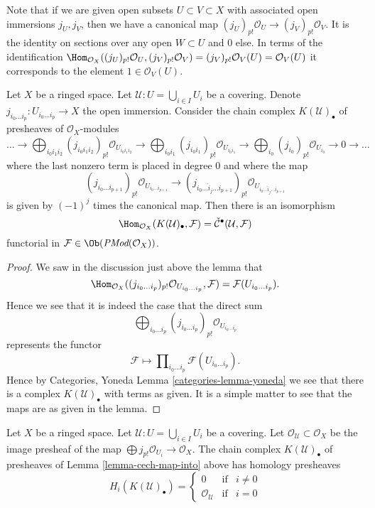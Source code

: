 \medskip\noindent
Note that if we are given open subsets $U \subset V \subset X$
with associated open immersions $j_U, j_V$, then we have a canonical
map $(j_U)_{p!}\mathcal{O}_U \to (j_V)_{p!}\mathcal{O}_V$. It is the
identity on sections over any open $W \subset U$ and $0$ else.
In terms of the identification
$\Hom_{\mathcal{O}_X}((j_U)_{p!}\mathcal{O}_U, (j_V)_{p!}\mathcal{O}_V) =
(j_V)_{p!}\mathcal{O}_V(U) = \mathcal{O}_V(U)$ it corresponds to
the element $1 \in \mathcal{O}_V(U)$.

\begin{lemma}
\label{lemma-cech-map-into}
Let $X$ be a ringed space.
Let $\mathcal{U} : U = \bigcup_{i \in I} U_i$ be a covering.
Denote $j_{i_0\ldots i_p} : U_{i_0 \ldots i_p} \to X$ the open immersion.
Consider the chain complex $K(\mathcal{U})_\bullet$
of presheaves of $\mathcal{O}_X$-modules
$$
\ldots
\to
\bigoplus_{i_0i_1i_2} (j_{i_0i_1i_2})_{p!}\mathcal{O}_{U_{i_0i_1i_2}}
\to
\bigoplus_{i_0i_1} (j_{i_0i_1})_{p!}\mathcal{O}_{U_{i_0i_1}}
\to
\bigoplus_{i_0} (j_{i_0})_{p!}\mathcal{O}_{U_{i_0}}
\to 0 \to \ldots
$$
where the last nonzero term is placed in degree $0$
and where the map
$$
(j_{i_0\ldots i_{p + 1}})_{p!}\mathcal{O}_{U_{i_0\ldots i_{p + 1}}}
\longrightarrow
(j_{i_0\ldots \hat i_j \ldots i_{p + 1}})_{p!}
\mathcal{O}_{U_{i_0\ldots \hat i_j \ldots i_{p + 1}}}
$$
is given by $(-1)^j$ times the canonical map.
Then there is an isomorphism
$$
\Hom_{\mathcal{O}_X}(K(\mathcal{U})_\bullet, \mathcal{F})
=
\check{\mathcal{C}}^\bullet(\mathcal{U}, \mathcal{F})
$$
functorial in $\mathcal{F} \in \Ob(\textit{PMod}(\mathcal{O}_X))$.
\end{lemma}

\begin{proof}
We saw in the discussion just above the lemma that
$$
\Hom_{\mathcal{O}_X}(
(j_{i_0\ldots i_p})_{p!}\mathcal{O}_{U_{i_0\ldots i_p}},
\mathcal{F})
=
\mathcal{F}(U_{i_0\ldots i_p}).
$$
Hence we see that it is indeed the case that the direct sum
$$
\bigoplus\nolimits_{i_0 \ldots i_p}
(j_{i_0 \ldots i_p})_{p!}\mathcal{O}_{U_{i_0 \ldots i_p}}
$$
represents the functor
$$
\mathcal{F}
\longmapsto
\prod\nolimits_{i_0\ldots i_p} \mathcal{F}(U_{i_0\ldots i_p}).
$$
Hence by Categories, Yoneda Lemma \ref{categories-lemma-yoneda}
we see that there is a complex $K(\mathcal{U})_\bullet$ with terms
as given. It is a simple matter to see that the maps are as given
in the lemma.
\end{proof}

\begin{lemma}
\label{lemma-homology-complex}
Let $X$ be a ringed space.
Let $\mathcal{U} : U = \bigcup_{i \in I} U_i$ be a covering.
Let $\mathcal{O}_\mathcal{U} \subset \mathcal{O}_X$
be the image presheaf of the map
$\bigoplus j_{p!}\mathcal{O}_{U_i} \to \mathcal{O}_X$.
The chain complex $K(\mathcal{U})_\bullet$ of presheaves
of Lemma \ref{lemma-cech-map-into} above has homology presheaves
$$
H_i(K(\mathcal{U})_\bullet) =
\left\{
\begin{matrix}
0 & \text{if} & i \not = 0 \\
\mathcal{O}_\mathcal{U} & \text{if} & i = 0
\end{matrix}
\right.
$$
\end{lemma}

